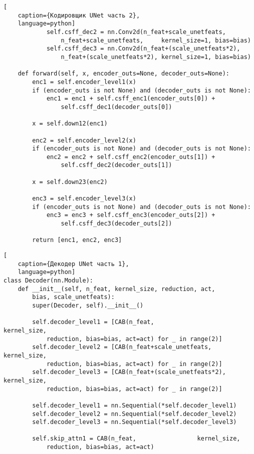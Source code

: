 \begin{lstlisting}[
    caption={Кодировщик UNet часть 2},
    language=python]
            self.csff_dec2 = nn.Conv2d(n_feat+scale_unetfeats,     
                n_feat+scale_unetfeats,     kernel_size=1, bias=bias)
            self.csff_dec3 = nn.Conv2d(n_feat+(scale_unetfeats*2), 
                n_feat+(scale_unetfeats*2), kernel_size=1, bias=bias)

    def forward(self, x, encoder_outs=None, decoder_outs=None):
        enc1 = self.encoder_level1(x)
        if (encoder_outs is not None) and (decoder_outs is not None):
            enc1 = enc1 + self.csff_enc1(encoder_outs[0]) + 
                self.csff_dec1(decoder_outs[0])

        x = self.down12(enc1)

        enc2 = self.encoder_level2(x)
        if (encoder_outs is not None) and (decoder_outs is not None):
            enc2 = enc2 + self.csff_enc2(encoder_outs[1]) + 
                self.csff_dec2(decoder_outs[1])

        x = self.down23(enc2)

        enc3 = self.encoder_level3(x)
        if (encoder_outs is not None) and (decoder_outs is not None):
            enc3 = enc3 + self.csff_enc3(encoder_outs[2]) + 
                self.csff_dec3(decoder_outs[2])
        
        return [enc1, enc2, enc3]
\end{lstlisting}

\begin{lstlisting}[
    caption={Декодер UNet часть 1},
    language=python]
class Decoder(nn.Module):
    def __init__(self, n_feat, kernel_size, reduction, act, 
        bias, scale_unetfeats):
        super(Decoder, self).__init__()

        self.decoder_level1 = [CAB(n_feat,                     kernel_size, 
            reduction, bias=bias, act=act) for _ in range(2)]
        self.decoder_level2 = [CAB(n_feat+scale_unetfeats,     kernel_size, 
            reduction, bias=bias, act=act) for _ in range(2)]
        self.decoder_level3 = [CAB(n_feat+(scale_unetfeats*2), kernel_size, 
            reduction, bias=bias, act=act) for _ in range(2)]

        self.decoder_level1 = nn.Sequential(*self.decoder_level1)
        self.decoder_level2 = nn.Sequential(*self.decoder_level2)
        self.decoder_level3 = nn.Sequential(*self.decoder_level3)

        self.skip_attn1 = CAB(n_feat,                 kernel_size, 
            reduction, bias=bias, act=act)
\end{lstlisting}

